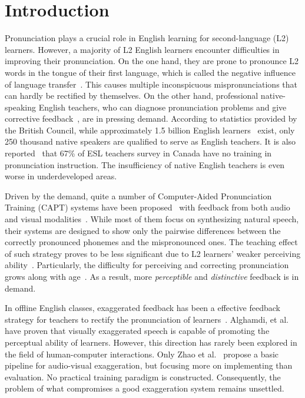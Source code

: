 \documentclass[sigconf]{acmart}
\begin{document}
\section{Introduction}
Pronunciation plays a crucial role in English learning for second-language (L2) learners. 
However, a majority of L2 English learners encounter difficulties in improving their pronunciation. 
On the one hand, they are prone to pronounce L2 words in the tongue of their first language,
which is called the negative influence of language transfer~\cite{strange1995speech,meng2007deriving,derwing2002esl,kartushina2014effects,cortes2005negative}. This causes multiple inconspicuous mispronunciations that can hardly be rectified by themselves.
On the other hand, professional native-speaking English teachers, who can diagnose pronunciation problems and give corrective feedback~\cite{lightbown2000they}, are in pressing demand. 
According to statistics provided by the British Council, while approximately 1.5 billion English learners~\cite{council2013english} exist, only 250 thousand native speakers are qualified to serve as English teachers. It is also reported~\cite{derwing2005second} that 67\% of ESL teachers survey in Canada have no training in pronunciation instruction.
The insufficiency of native English teachers is even worse in underdeveloped areas.


Driven by the demand, quite a number of Computer-Aided Pronunciation Training (CAPT) systems  have been proposed~\cite{badin2010visual,iribe2011generating,meng2012hierarchical,meng2014synthesizing,ning2015hmm,meng2010synthesizing} 
with feedback from both audio and visual modalities~\cite{lu2010castle,lu2012automatic,wong2010development,leung2013development,yuen2011enunciate}. While most of them focus on synthesizing natural speech, their systems are designed to show only the pairwise differences between the correctly pronounced phonemes and the mispronounced ones.
The teaching effect of such strategy proves to be less significant due to L2 learners' weaker perceiving ability~\cite{escudero2001role}. Particularly, the difficulty for perceiving and correcting pronunciation grows along with age~\cite{khul255b,polka1994developmental}. As a result, more \textit{perceptible} and \textit{distinctive} feedback is in demand.
%

In offline English classes, exaggerated feedback has been a effective feedback strategy for teachers to rectify the pronunciation of learners~\cite{mora2017relationship,polka1994developmental}. Alghamdi, et al.~\cite{alghamdi2017impact} have proven that visually exaggerated speech is capable of promoting the perceptual ability of learners. %
However, this direction has rarely been explored in the field of human-computer interactions. Only Zhao et al.~\cite{zhao2013audiovisual} propose a basic pipeline for audio-visual exaggeration, but focusing more on implementing than evaluation. No practical training paradigm is constructed. %
Consequently, the problem of what compromises a good exaggeration system remains unsettled. %
\end{document}
